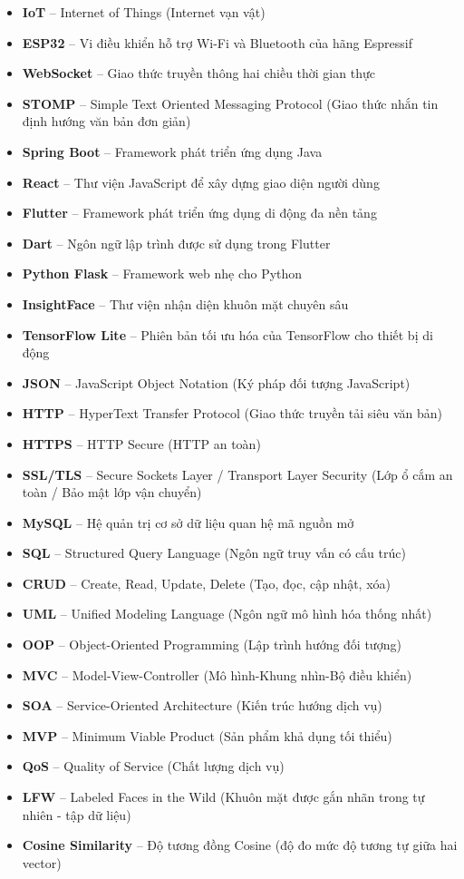 \documentclass[DoAn.tex]{subfiles}
\begin{document}
\begin{itemize}
    \item \textbf{IoT} -- Internet of Things (Internet vạn vật)
    \item \textbf{ESP32} -- Vi điều khiển hỗ trợ Wi-Fi và Bluetooth của hãng Espressif
    \item \textbf{WebSocket} -- Giao thức truyền thông hai chiều thời gian thực
    \item \textbf{STOMP} -- Simple Text Oriented Messaging Protocol (Giao thức nhắn tin định hướng văn bản đơn giản)
    \item \textbf{Spring Boot} -- Framework phát triển ứng dụng Java
    \item \textbf{React} -- Thư viện JavaScript để xây dựng giao diện người dùng
    \item \textbf{Flutter} -- Framework phát triển ứng dụng di động đa nền tảng
    \item \textbf{Dart} -- Ngôn ngữ lập trình được sử dụng trong Flutter
    \item \textbf{Python Flask} -- Framework web nhẹ cho Python
    \item \textbf{InsightFace} -- Thư viện nhận diện khuôn mặt chuyên sâu
    \item \textbf{TensorFlow Lite} -- Phiên bản tối ưu hóa của TensorFlow cho thiết bị di động
    \item \textbf{JSON} -- JavaScript Object Notation (Ký pháp đối tượng JavaScript)
    \item \textbf{HTTP} -- HyperText Transfer Protocol (Giao thức truyền tải siêu văn bản)
    \item \textbf{HTTPS} -- HTTP Secure (HTTP an toàn)
    \item \textbf{SSL/TLS} -- Secure Sockets Layer / Transport Layer Security (Lớp ổ cắm an toàn / Bảo mật lớp vận chuyển)
    \item \textbf{MySQL} -- Hệ quản trị cơ sở dữ liệu quan hệ mã nguồn mở
    \item \textbf{SQL} -- Structured Query Language (Ngôn ngữ truy vấn có cấu trúc)
    \item \textbf{CRUD} -- Create, Read, Update, Delete (Tạo, đọc, cập nhật, xóa)
    \item \textbf{UML} -- Unified Modeling Language (Ngôn ngữ mô hình hóa thống nhất)
    \item \textbf{OOP} -- Object-Oriented Programming (Lập trình hướng đối tượng)
    \item \textbf{MVC} -- Model-View-Controller (Mô hình-Khung nhìn-Bộ điều khiển)
    \item \textbf{SOA} -- Service-Oriented Architecture (Kiến trúc hướng dịch vụ)
    \item \textbf{MVP} -- Minimum Viable Product (Sản phẩm khả dụng tối thiểu)
    \item \textbf{QoS} -- Quality of Service (Chất lượng dịch vụ)
    \item \textbf{LFW} -- Labeled Faces in the Wild (Khuôn mặt được gắn nhãn trong tự nhiên - tập dữ liệu)
    \item \textbf{Cosine Similarity} -- Độ tương đồng Cosine (độ đo mức độ tương tự giữa hai vector)
\end{itemize}
\end{document}
